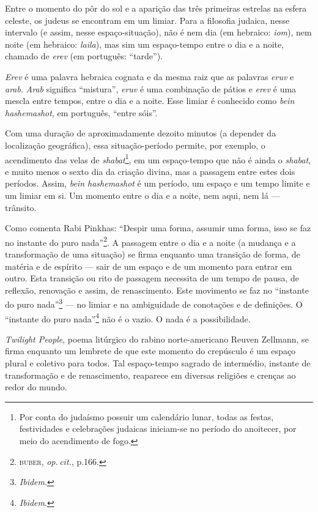 Entre o momento do pôr do sol e a aparição das três primeiras estrelas
na esfera celeste, os judeus se encontram em um limiar. Para a filosofia
judaica, nesse intervalo (e assim, nesse espaço-situação), não é nem dia
(em hebraico: \emph{iom}), nem noite (em hebraico: \emph{laila}), mas
sim um espaço-tempo entre o dia e a noite, chamado de \emph{erev} (em
português: ``tarde'').

\emph{Erev} é uma palavra hebraica cognata e da mesma raiz que as
palavras \emph{eruv} e \emph{arab}. \emph{Arab} significa ``mistura'',
\emph{eruv} é uma combinação de pátios e \emph{erev} é uma mescla entre
tempos, entre o dia e a noite. Esse limiar é conhecido como \emph{bein
hashemashot}, em português, ``entre sóis''.

Com uma duração de aproximadamente dezoito minutos (a depender da
localização geográfica), essa situação-período permite, por exemplo, o
acendimento das velas de \emph{shabat}\footnote{Por conta do judaísmo
  possuir um calendário lunar, todas as festas, festividades e
  celebrações judaicas iniciam-se no período do anoitecer, por meio do
  acendimento de fogo.}, em um espaço-tempo que não é ainda o
\emph{shabat}, e muito menos o sexto dia da criação divina, mas a
passagem entre estes dois períodos. Assim, \emph{bein hashemashot} é um
período, um espaço e um tempo limite e um limiar em si. Um momento entre
o dia e a noite, nem aqui, nem lá --- trânsito.

Como comenta Rabi Pinkhas: ``Despir uma forma, assumir uma forma,
isso se faz no instante do puro nada''\footnote{\textsc{buber}, \emph{op.\,cit.}, p.166.}.
A passagem entre o dia e a noite (a mudança e a transformação de uma
situação) se firma enquanto uma transição de forma, de matéria e de
espírito --- sair de um espaço e de um momento para entrar em outro.
Esta transição ou rito de passagem necessita de um tempo de pausa, de
reflexão, renovação e assim, de renascimento. Este movimento se faz no
``instante do puro nada''\footnote{\emph{Ibidem}.} --- no limiar e na
ambiguidade de conotações e de definições. O ``instante do puro
nada''\footnote{\emph{Ibidem}.} não é o vazio. O nada é a possibilidade.

\emph{Twilight People}, poema litúrgico do rabino norte-americano Reuven
Zellmann, se firma enquanto um lembrete de que este momento do
crepúsculo é um espaço plural e coletivo para todos. Tal espaço-tempo
sagrado de intermédio, instante de transformação e de renascimento,
reaparece em diversas religiões e crenças ao redor do mundo.

